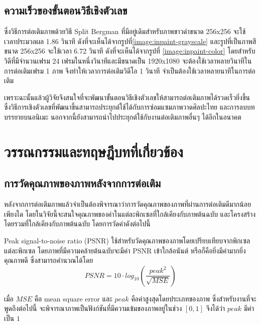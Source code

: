 \documentclass[hidelinks,a4paper,14pt]{article}
\numberwithin{equation}{section}							%
\begin{document}
{		 %
		 \subsection{ความเร็วของขั้นตอนวิธีเชิงตัวเลข}
		 \hspace{1cm}ซึ่งวิธีการต่อเติมภาพด้วยวิธี Split Bergman ที่มีอยู่เดิมสำหรับภาพขาวดำขนาด 256x256 จะใช้เวลาประมวลผล 1.86 วินาที ดังที่จะเห็นได้จากรูปที่\ref{image:inpaint-grayscale} และรูปที่เป็นภาพสีขนาด 256x256 จะใช้เวลา 6.72 วินาที ดังที่จะเห็นได้จากรูปที่ \ref{image:inpaint-color} โดยสำหรับวิดีที่มีจำนวนเฟรม 24 เฟรมในหนึ่งวินาทีและมีขนาดเป็น 1920x1080 จะต้องใช้เวลาหลายวินาทีในการต่อเติมเฟรม 1 ภาพ จึงทำให้เวลาการต่อเติมวิดีโอ 1 วินาที จำเป็นต้องใช้เวลาหลายนาทีในการต่อเติม
		 
		 \hspace{1cm}เพราะฉะนั้นแล้วผู้วิจัยจึงสนใจที่จะพัฒนาขั้นตอนวิธีเชิงตัวเลขให้สามารถต่อเติมภาพได้รวดเร็วยิ่งขึ้น ซึ่งวิธีการเชิงตัวเลขที่พัฒนาขึ้นสามารถประยุกต์ใช้ได้กับการซ่อมแซมภาพวาดศิลปะไทย และการลบบทบรรยายบนอนิเมะ นอกจากนี้ยังสามารถนำไปประยุกต์ใช้กับงานต่อเติมภาพอื่นๆ ได้อีกในอนาคต
		 
\section{วรรณกรรมและทฤษฎีบทที่เกี่ยวข้อง}
 \subsection{การวัดคุณภาพของภาพหลังจากการต่อเติม}
	\hspace{1cm} หลังจากการต่อเติมภาพแล้วจำเป็นต้องพิจารณาว่าการวัดคุณภาพของภาพที่ผ่านการต่อเติมดีมากน้อยเพียงใด โดยในวิจัยนี้จะสนใจคุณภาพของค่าในแต่ละพิกเซลที่ใกล้เคียงกับภาพต้นฉบับ และโครงสร้างโดยรวมที่ใกล้เคียงกับภาพต้นฉบับ โดยการวัดค่าดังต่อไปนี้
	
	\hspace{1cm}  Peak signal-to-noise ratio (PSNR) \cite{ref:PSNR} ใช้สำหรับวัดคุณภาพของภาพโดยเปรียบเทียบจากพิกเซลแต่ละพิกเซล โดยภาพที่มีความคล้ายต้นฉบับจะมีค่า PSNR เข้าใกล้อนันต์ หรือก็คือยิ่งมีค่ามากยิ่งคุณภาพดี ซึ่งสามารถคำนวณได้โดย
	$$ PSNR = 10 \cdot log_{10} ( \frac{{peak}^2}{\sqrt{MSE}} )$$
	
	เมื่อ $MSE$ คือ mean square error และ $peak$ คือค่าสูงสุดโดยประเภทของภาพ ซึ่งสำหรับงานที่จะพูดถึงต่อไปนี้ จะพิจารณาภาพเป็นฟังก์ชันที่มีความเข้มของภาพอยู่ในช่วง $ [0,1] $ จึงได้ว่า $peak$ มีค่าเป็น $1$

}
\end{document}
